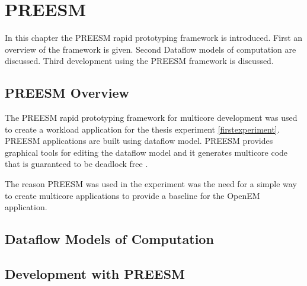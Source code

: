 \chapter{PREESM}
\label{chapter:preesm}
In this chapter the PREESM rapid prototyping framework is introduced. First an
overview of the framework is given. Second Dataflow models of computation are
discussed. Third development using the PREESM framework is discussed.

\section{PREESM Overview}
\label{sec:preesmover}
The PREESM rapid prototyping framework for multicore development was used to
create a workload application for the thesis experiment \ref{firstexperiment}.
PREESM applications are built using dataflow model. PREESM provides graphical
tools for editing the dataflow model and it generates multicore code that is
guaranteed to be deadlock free \cite{pelcat2014preesm}. 

The reason PREESM was used in the experiment was the need for a simple way to
create multicore applications to provide a baseline for the OpenEM application.

\section{Dataflow Models of Computation}
\label{sec:dataflow}

\section{Development with PREESM}
\label{sec:preesmdev}
